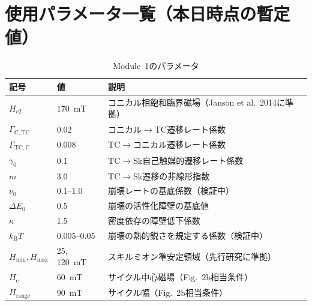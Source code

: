 \documentclass[11pt,a4paper]{ltjsarticle}
\begin{document}
\section{使用パラメータ一覧（本日時点の暫定値）}\label{app:params}

\begin{table}[htbp]
\centering
\caption{Module~1のパラメータ}
\label{tab:params_m1}
\small
\begin{tabular}{@{}llp{62mm}@{}}
\toprule
\textbf{記号} & \textbf{値} & \textbf{説明} \\
\midrule
$H_{c2}$ & \SI{170}{mT} & コニカル相飽和臨界磁場（Janson et al.\ 2014に準拠） \\
$\Gamma_\mathrm{C,TC}$ & 0.02 & コニカル$\to$TC遷移レート係数 \\
$\Gamma_\mathrm{TC,C}$ & 0.008 & TC$\to$コニカル遷移レート係数 \\
$\gamma_0$ & 0.1 & TC$\to$Sk自己触媒的遷移レート係数 \\
$m$ & 3.0 & TC$\to$Sk遷移の非線形指数 \\
$\nu_0$ & 0.1--1.0 & 崩壊レートの基底係数（検証中） \\
$\Delta E_0$ & 0.5 & 崩壊の活性化障壁の基底値 \\
$\kappa$ & 1.5 & 密度依存の障壁低下係数 \\
$k_\mathrm{B}T$ & 0.005--0.05 & 崩壊の熱的鋭さを規定する係数（検証中） \\
$H_\mathrm{min}, H_\mathrm{max}$ & 25, \SI{120}{mT} & スキルミオン準安定領域（先行研究に準拠） \\
$H_\mathrm{c}$ & \SI{60}{mT} & サイクル中心磁場（Fig.~2b相当条件） \\
$H_\mathrm{range}$ & \SI{90}{mT} & サイクル幅（Fig.~2b相当条件） \\
\bottomrule
\end{tabular}
\end{table}
\end{document}

